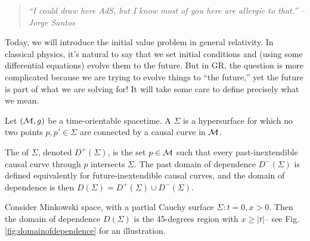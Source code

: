 \begin{quote}
    \textit{``I could draw here AdS, but I know most of you here are allergic to that.'' --Jorge Santos}
\end{quote}

Today, we will introduce the initial value problem in general relativity. In classical physics, it's natural to say that we set initial conditions and (using some differential equations) evolve them to the future. But in GR, the question is more complicated because we are trying to evolve things to ``the future,'' yet the future is part of what we are solving for! It will take some care to define precisely what we mean.

\begin{defn}
    Let $(\mathcal{M},g)$ be a time-orientable spacetime. A  $\Sigma$ is a hypersurface for which no two points $p,p'\in \Sigma$ are connected by a causal curve in $\mathcal{M}$.
\end{defn}
\begin{defn}
    The  of $\Sigma$, denoted $D^+(\Sigma)$, is the set $p\in \mathcal{M}$ such that every past-inextendible causal curve through $p$ intersects $\Sigma$. The past domain of dependence $D^-(\Sigma)$ is defined equivalently for future-inextendible causal curves, and the domain of dependence is then $D(\Sigma)=D^+(\Sigma)\cup D^-(\Sigma)$.
\end{defn}
\begin{exm}
    Consider Minkowski space, with a partial Cauchy surface $\Sigma:t=0,x >0$. Then the domain of dependence $D(\Sigma)$ is the 45-degrees region with $x\geq |t|$-- see Fig. \ref{fig:domainofdependence} for an illustration.
\end{exm}

